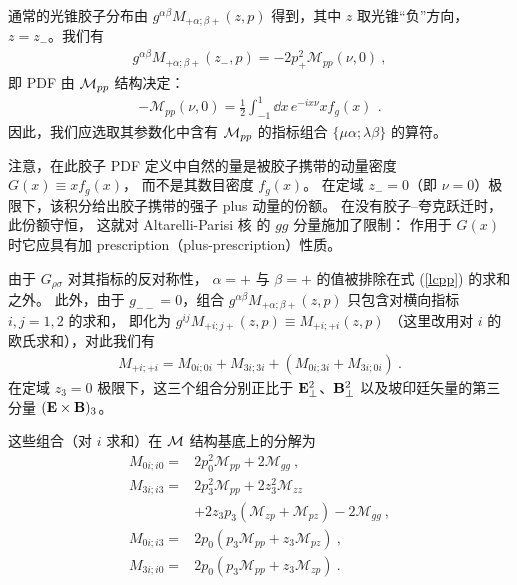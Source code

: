 通常的光锥胶子分布由
$g^{\alpha \beta} { M}_{+ \alpha; \beta +} (z,p)$ 得到，其中 $z$ 取光锥``负''方向，
$z=z_-$。我们有
\begin{align}
g^{\alpha \beta} { M}_{+ \alpha; \beta +} (z_-,p) =-2 p_+ ^2 \mathcal{M}_{pp}(\nu ,0) \ ,
\label{lcpp}
\end{align}
即 PDF 由 ${\cal M}_{pp}$ 结构决定：
\begin{align}
- \mathcal{M}_{pp} (\nu,0) =\frac12
\int_{-1}^1 \dd x \, e^{-i x \nu} x f_g (x) \, \ .
\label{glPDF}
\end{align}
因此，我们应选取其参数化中含有 ${\cal M}_{pp}$
的指标组合 $\{\mu \alpha; \lambda \beta \}$ 的算符。

注意，在此胶子 PDF 定义中自然的量是被胶子携带的动量密度 \mbox{$G(x) \equiv x f_g (x)$}，
而不是其数目密度 $f_g (x)$。
在定域 $z_-=0$（即 $\nu=0$）极限下，该积分给出胶子携带的强子 plus 动量的份额。
在没有胶子--夸克跃迁时，此份额守恒，
这就对 Altarelli-Parisi 核 \cite{Altarelli:1977zs} 的 $gg$ 分量施加了限制：
作用于 $G(x)$ 时它应具有加 prescription（plus-prescription）性质。

由于 $G_{\rho \sigma}$ 对其指标的反对称性，
$\alpha=+$ 与 $\beta= +$ 的值被排除在式 (\ref{lcpp}) 的求和之外。
此外，由于 $g_{- -} =0$，组合
$g^{\alpha \beta} { M}_{+ \alpha; \beta +} (z,p)$ 只包含对横向指标 $i,j =1,2$ 的求和，
即化为 $g^{ij} { M}_{+ i; j +} (z,p) \equiv { M}_{+ i; + i} (z,p)$
（这里改用对 $i$ 的欧氏求和），对此我们有
\begin{align}
{ M}_{+ i; +i}
= { M}_{0 i; 0i} + { M}_{3 i; 3i} + ({ M}_{0 i; 3i} +
{ M}_{3 i; 0i}) \ .
\label{ii}
\end{align}
在定域 $z_3=0$ 极限下，这三个组合分别正比于 ${\bf E}^2_\perp$、${\bf B}^2_\perp$
以及坡印廷矢量的第三分量 $({\bf E \times B})_3$。

这些组合（对 $i$ 求和）在 ${\cal M}$ 结构基底上的分解为
\begin{align}
{ M}_{0 i; i 0 } = & 2 p_0^2 \mathcal{M}_{pp} +2 \mathcal{M}_{gg} \ , \\
{ M}_{3 i; i 3 } = &2 p_3^2 \mathcal{M}_{pp}+2 z_3^2 \mathcal{M}_{zz} \nonumber \\ &
+2 z_3 p_3 \left( \mathcal{M}_{zp} + \mathcal{M}_{pz} \right) - 2\mathcal{M}_{gg} \ ,
\\
{ M}_{0 i; i 3 } = & 2 p_0 \left( p_3 \mathcal{M}_{pp} + z_3 \mathcal{M}_{pz} \right) \ ,
\\
{ M}_{3 i; i 0 } = & 2 p_0 \left( p_3 \mathcal{M}_{pp} + z_3 \mathcal{M}_{zp} \right) \ .
\end{align}

